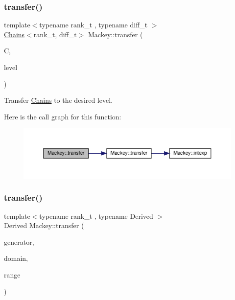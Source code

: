 \subsubsection{\texorpdfstring{transfer()}{transfer()}\hspace{0.1cm}{\footnotesize\ttfamily [4/6]}}
{\footnotesize\ttfamily template$<$typename rank\+\_\+t , typename diff\+\_\+t $>$ \\
\hyperlink{classMackey_1_1Chains}{Chains}$<$rank\+\_\+t, diff\+\_\+t$>$ Mackey\+::transfer (\begin{DoxyParamCaption}\item[{const \hyperlink{classMackey_1_1Chains}{Chains}$<$ rank\+\_\+t, diff\+\_\+t $>$ \&}]{C,  }\item[{int}]{level }\end{DoxyParamCaption})}



Transfer \hyperlink{classMackey_1_1Chains}{Chains} to the desired level. 

Here is the call graph for this function\+:\nopagebreak
\begin{figure}[H]
\begin{center}
\leavevmode
\includegraphics[width=350pt]{namespaceMackey_a50837580391b5c6705e23c637d742b22_cgraph}
\end{center}
\end{figure}
\mbox{\label{namespaceMackey_a0550bf97e47b3c319cb5e1bd81008d89}} 
\subsubsection{\texorpdfstring{transfer()}{transfer()}\hspace{0.1cm}{\footnotesize\ttfamily [5/6]}}
{\footnotesize\ttfamily template$<$typename rank\+\_\+t , typename Derived $>$ \\
Derived Mackey\+::transfer (\begin{DoxyParamCaption}\item[{const Eigen\+::\+Matrix\+Base$<$ Derived $>$ \&}]{generator,  }\item[{const rank\+\_\+t \&}]{domain,  }\item[{const rank\+\_\+t \&}]{range }\end{DoxyParamCaption})}



